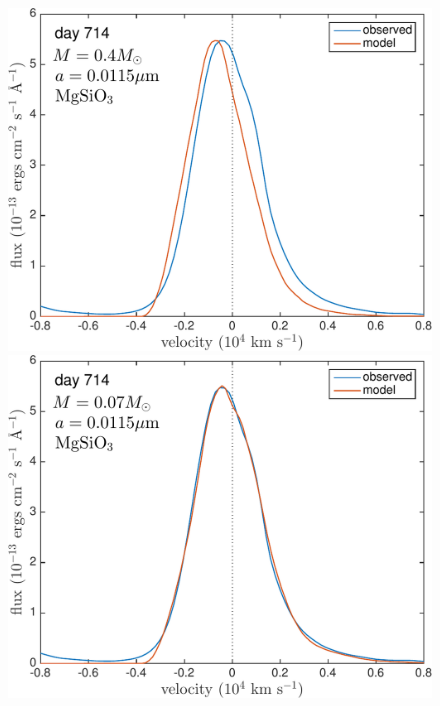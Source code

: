 \begin{figure}
\includegraphics[trim =0 20 0 0,clip=true,scale=0.35]{chapters/chapter5/images/silicates_take2/MgSiO3_Dwek_Ha.pdf}
\hspace{3mm}
\includegraphics[trim =0 20 0 -10,clip=true,scale=0.35]{chapters/chapter5/images/silicates_take2/MgSiO3_bestfit_Ha.pdf}


\end{figure}
